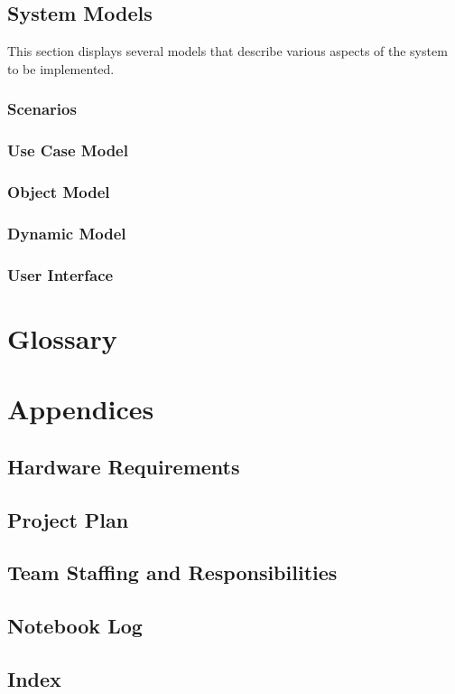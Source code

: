 \documentclass[11pt]{article}
\begin{document}
    \subsection{System Models}
        This section displays several models that describe various aspects of
        the system to be implemented.
        \subsubsection{Scenarios}

        \subsubsection{Use Case Model}

        \subsubsection{Object Model}

        \subsubsection{Dynamic Model}

        \subsubsection{User Interface}

\section{Glossary}

\section{Appendices}

    \subsection{Hardware Requirements}

    \subsection{Project Plan}

    \subsection{Team Staffing and Responsibilities}

    \subsection{Notebook Log}

    \subsection{Index}
    \printindex
    
\end{document}
